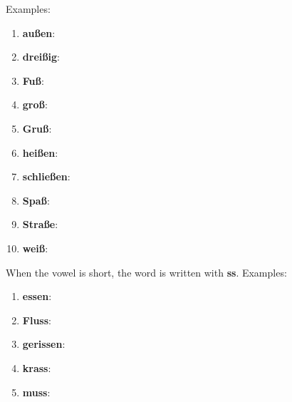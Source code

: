 Examples:
\begin{enumerate}
    \item \textbf{außen}: \textipa{["aUs@n]}
    \item \textbf{dreißig}: \textipa{["draIsI\c{c}]}
    \item \textbf{Fuß}: \textipa{[fu:s]}
    \item \textbf{groß}: \textipa{[gro:s]}
    \item \textbf{Gruß}: \textipa{[gru:s]}
    \item \textbf{heißen}: \textipa{["haIs@n]}
    \item \textbf{schließen}: \textipa{["Sli:s@n]}
    \item \textbf{Spaß}: \textipa{[Spa:s]}
    \item \textbf{Straße}: \textipa{["Stra:s@]}
    \item \textbf{weiß}: \textipa{[vaIs]}
\end{enumerate}

When the vowel is short, the word is written with \textbf{ss}. Examples:

\begin{enumerate}
    \item \textbf{essen}: \textipa{["Es@n]}
    \item \textbf{Fluss}: \textipa{[flUs]}
    \item \textbf{gerissen}: \textipa{[g@"rIs@n]}
    \item \textbf{krass}: \textipa{[kras]}
    \item \textbf{muss}: \textipa{[mUs]}
\end{enumerate}
